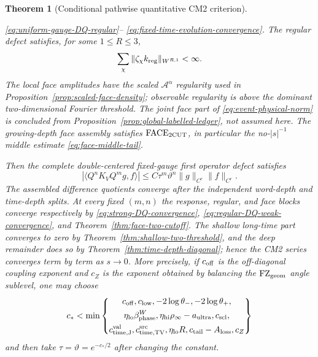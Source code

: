\documentclass[11pt]{article}
\newtheorem{theorem}{Theorem}[section]
\begin{document}
\begin{theorem}[Conditional pathwise quantitative CM2 criterion]
\begin{enumerate}[label=\textup{(H\arabic*)}]
      \eqref{eq:uniform-gauge-DQ-regular}--
      \eqref{eq:fixed-time-evolution-convergence}.  The regular defect
      satisfies, for some
      $1\le R\le3$,
      \[
       \sum_\chi\|\zeta_\chi k_{\rm reg}\|_{W^{R,1}}<\infty.
      \]
      The local face amplitudes have the scaled
      $\mathcal A^\alpha$ regularity used in
      Proposition~\ref{prop:scaled-face-density}; observable regularity is
      above the dominant two-dimensional Fourier threshold.  The joint face
      part of \eqref{eq:event-physical-norm} is concluded from
      Proposition~\ref{prop:global-labelled-ledger}, not assumed here.
      The growing-depth face assembly satisfies
      $\mathrm{FACE}_{\rm 2CUT}$, in particular the no-$|s|^{-1}$ middle
      estimate \eqref{eq:face-middle-tail}.
\end{enumerate}
Then the complete double-centered fixed-gauge first operator defect satisfies
\[
 |\langle Q^nK_VQ^mg,f\rangle|
 \le C\tau^m\vartheta^n\|g\|_{C^r}\|f\|_{C^r}.
\]
The assembled difference quotients converge after the independent word-depth
and time-depth splits.  At every fixed $(m,n)$ the response, regular, and face
blocks converge respectively by
\eqref{eq:strong-DQ-convergence},
\eqref{eq:regular-DQ-weak-convergence}, and
Theorem~\ref{thm:face-two-cutoff}.  The shallow long-time part converges to zero by
Theorem~\ref{thm:shallow-two-threshold}, and the deep remainder does so by
Theorem~\ref{thm:time-depth-diagonal}; hence the CM2 series converges term by
term as $s\to0$.  More
precisely, if $c_{\rm off}$ is the off-diagonal coupling exponent and $c_Z$
is the exponent obtained by balancing the $\mathrm{FZ}_{\rm geom}$ angle sublevel, one
may choose
\begin{equation}
\label{eq:final-CM2-exponent}
 c_*<\min\left\{
 \begin{gathered}
 c_{\rm off},c_{\rm low},-2\log\theta_-,-2\log\theta_+,\\
 \eta_{\rm lo}\beta_{\rm phase}^{W},
 \eta_{\rm hi}\rho_\infty-a_{\rm ultra},c_{\rm scl},\\
 c_{\rm time,J}^{\rm val},c_{\rm time,TV}^{\rm src},
 \eta_{\rm lo}R,c_{\rm tail}-A_{\rm loss},c_Z
 \end{gathered}
 \right\}
\end{equation}
and then take $\tau=\vartheta=e^{-c_*/2}$ after changing the constant.
\end{theorem}
\end{document}
